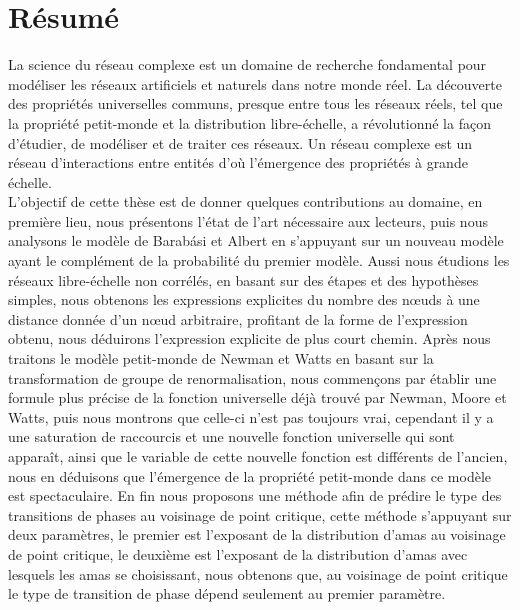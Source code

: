 %
%
\chapter*{Résumé}
 La science du réseau complexe est un domaine de recherche fondamental pour modéliser les réseaux artificiels et naturels dans notre monde réel. La découverte
 des propriétés universelles communs, presque entre tous les réseaux réels, tel que la propriété petit-monde et la distribution libre-échelle, a révolutionné la façon
 d’étudier, de modéliser et de traiter ces réseaux.
 Un réseau complexe est un réseau d’interactions entre entités d’où l’émergence
 des propriétés à grande échelle.\\ L'objectif de cette thèse est de donner quelques contributions au domaine, en première lieu, nous présentons l’état de l’art nécessaire aux lecteurs, puis nous analysons le modèle de Barabási et Albert en s'appuyant sur un nouveau modèle ayant le complément de la probabilité du premier modèle. Aussi nous étudions les réseaux libre-échelle non corrélés, en basant sur  des étapes et des hypothèses simples, nous obtenons les expressions explicites du nombre des nœuds à une distance donnée d'un nœud arbitraire, profitant de la forme de l'expression obtenu, nous déduirons l'expression explicite de plus court chemin. Après nous traitons le modèle petit-monde de Newman et Watts en basant sur la transformation de groupe de renormalisation, nous commençons par établir une formule plus précise de la fonction universelle déjà trouvé par Newman, Moore et Watts, puis nous montrons que celle-ci n'est pas toujours vrai, cependant il y a une saturation de raccourcis et une nouvelle fonction universelle qui sont apparaît, ainsi que le variable de cette nouvelle fonction est différents de l'ancien, nous en déduisons que l'émergence de la propriété petit-monde dans ce modèle est spectaculaire. En fin nous proposons une méthode afin de prédire le type des transitions de phases au voisinage de point critique, cette méthode s'appuyant sur deux paramètres, le premier est l'exposant de la distribution d'amas au voisinage de point critique, le deuxième est l'exposant de la distribution d'amas avec lesquels les amas se choisissant, nous obtenons que, au voisinage de point critique le type de transition de phase dépend seulement au premier paramètre. 